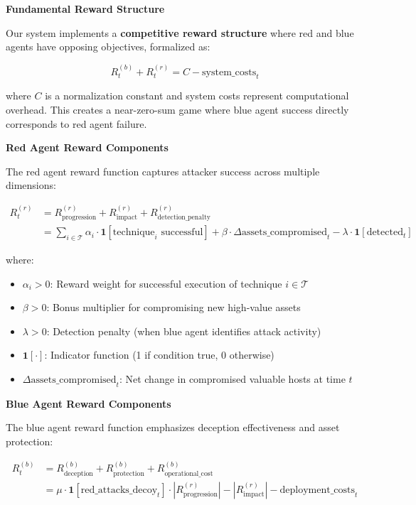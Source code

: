 \documentclass[12pt,oneside]{article}
\begin{document}
\textbf{Fundamental Reward Structure}

Our system implements a \textbf{competitive reward structure} where red and blue agents have opposing objectives, formalized as:

\begin{equation}
R^{(b)}_t + R^{(r)}_t = C - \text{system\_costs}_t
\end{equation}

where $C$ is a normalization constant and system costs represent computational overhead. This creates a near-zero-sum game where blue agent success directly corresponds to red agent failure.

\textbf{Red Agent Reward Components}

The red agent reward function captures attacker success across multiple dimensions:

\begin{align}
R^{(r)}_t &= R^{(r)}_{\text{progression}} + R^{(r)}_{\text{impact}} + R^{(r)}_{\text{detection\_penalty}} \\
&= \sum_{i \in \mathcal{T}} \alpha_i \cdot \mathbf{1}[\text{technique}_i \text{ successful}] + \beta \cdot \Delta\text{assets\_compromised}_t - \lambda \cdot \mathbf{1}[\text{detected}_t]
\end{align}

where:
\begin{itemize}
    \item $\alpha_i > 0$: Reward weight for successful execution of technique $i \in \mathcal{T}$
    \item $\beta > 0$: Bonus multiplier for compromising new high-value assets
    \item $\lambda > 0$: Detection penalty (when blue agent identifies attack activity)
    \item $\mathbf{1}[\cdot]$: Indicator function (1 if condition true, 0 otherwise)
    \item $\Delta\text{assets\_compromised}_t$: Net change in compromised valuable hosts at time $t$
\end{itemize}

\textbf{Blue Agent Reward Components}

The blue agent reward function emphasizes deception effectiveness and asset protection:

\begin{align}
R^{(b)}_t &= R^{(b)}_{\text{deception}} + R^{(b)}_{\text{protection}} + R^{(b)}_{\text{operational\_cost}} \\
&= \mu \cdot \mathbf{1}[\text{red\_attacks\_decoy}_t] \cdot |R^{(r)}_{\text{progression}}| - |R^{(r)}_{\text{impact}}| - \text{deployment\_costs}_t
\end{align}
\end{document}
